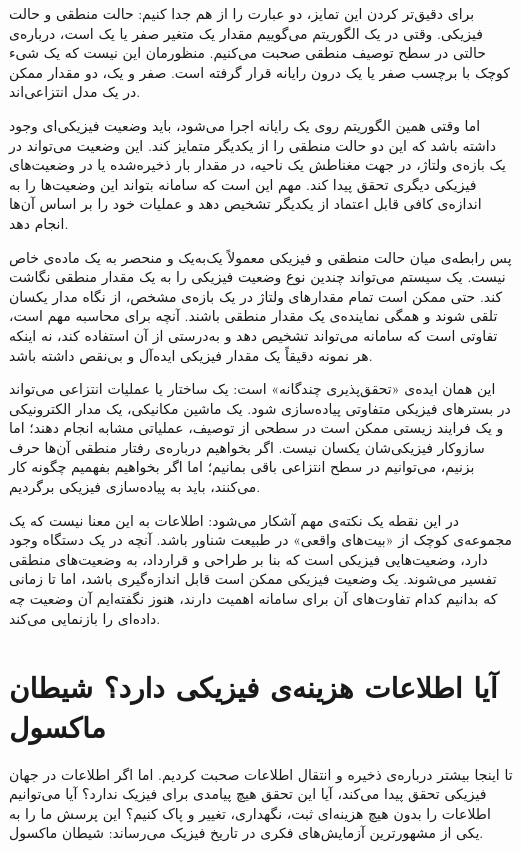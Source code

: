 برای دقیق‌تر کردن این تمایز، دو عبارت را از هم جدا کنیم: حالت منطقی و حالت فیزیکی. وقتی در یک الگوریتم می‌گوییم مقدار یک متغیر صفر یا یک است، درباره‌ی حالتی در سطح توصیف منطقی صحبت می‌کنیم. منظورمان این نیست که یک شیء کوچک با برچسب صفر یا یک درون رایانه قرار گرفته است. صفر و یک، دو مقدار ممکن در یک مدل انتزاعی‌اند.

اما وقتی همین الگوریتم روی یک رایانه اجرا می‌شود، باید وضعیت فیزیکی‌ای وجود داشته باشد که این دو حالت منطقی را از یکدیگر متمایز کند. این وضعیت می‌تواند در یک بازه‌ی ولتاژ، در جهت مغناطش یک ناحیه، در مقدار بار ذخیره‌شده یا در وضعیت‌های فیزیکی دیگری تحقق پیدا کند. مهم این است که سامانه بتواند این وضعیت‌ها را به اندازه‌ی کافی قابل اعتماد از یکدیگر تشخیص دهد و عملیات خود را بر اساس آن‌ها انجام دهد.

پس رابطه‌ی میان حالت منطقی و فیزیکی معمولاً یک‌به‌یک و منحصر به یک ماده‌ی خاص نیست. یک سیستم می‌تواند چندین نوع وضعیت فیزیکی را به یک مقدار منطقی نگاشت کند. حتی ممکن است تمام مقدارهای ولتاژ در یک بازه‌ی مشخص، از نگاه مدار یکسان تلقی شوند و همگی نماینده‌ی یک مقدار منطقی باشند. آنچه برای محاسبه مهم است، تفاوتی است که سامانه می‌تواند تشخیص دهد و به‌درستی از آن استفاده کند، نه اینکه هر نمونه دقیقاً یک مقدار فیزیکی ایده‌آل و بی‌نقص داشته باشد.

این همان ایده‌ی «تحقق‌پذیری چندگانه» است: یک ساختار یا عملیات انتزاعی می‌تواند در بسترهای فیزیکی متفاوتی پیاده‌سازی شود. یک ماشین مکانیکی، یک مدار الکترونیکی و یک فرایند زیستی ممکن است در سطحی از توصیف، عملیاتی مشابه انجام دهند؛ اما سازوکار فیزیکی‌شان یکسان نیست. اگر بخواهیم درباره‌ی رفتار منطقی آن‌ها حرف بزنیم، می‌توانیم در سطح انتزاعی باقی بمانیم؛ اما اگر بخواهیم بفهمیم چگونه کار می‌کنند، باید به پیاده‌سازی فیزیکی برگردیم. \autocite{sep-multiple-realizability,marr1982}

در این نقطه یک نکته‌ی مهم آشکار می‌شود: اطلاعات به این معنا نیست که یک مجموعه‌ی کوچک از «بیت‌های واقعی» در طبیعت شناور باشد. آنچه در یک دستگاه وجود دارد، وضعیت‌هایی فیزیکی است که بنا بر طراحی و قرارداد، به وضعیت‌های منطقی تفسیر می‌شوند. یک وضعیت فیزیکی ممکن است قابل اندازه‌گیری باشد، اما تا زمانی که بدانیم کدام تفاوت‌های آن برای سامانه اهمیت دارند، هنوز نگفته‌ایم آن وضعیت چه داده‌ای را بازنمایی می‌کند.

\section{آیا اطلاعات هزینه‌ی فیزیکی دارد؟ شیطان ماکسول}
\label{sec:maxwell-demon}

تا اینجا بیشتر درباره‌ی ذخیره و انتقال اطلاعات صحبت کردیم. اما اگر اطلاعات در جهان فیزیکی تحقق پیدا می‌کند، آیا این تحقق هیچ پیامدی برای فیزیک ندارد؟ آیا می‌توانیم اطلاعات را بدون هیچ هزینه‌ای ثبت، نگهداری، تغییر و پاک کنیم؟ این پرسش ما را به یکی از مشهورترین آزمایش‌های فکری در تاریخ فیزیک می‌رساند: شیطان ماکسول.

